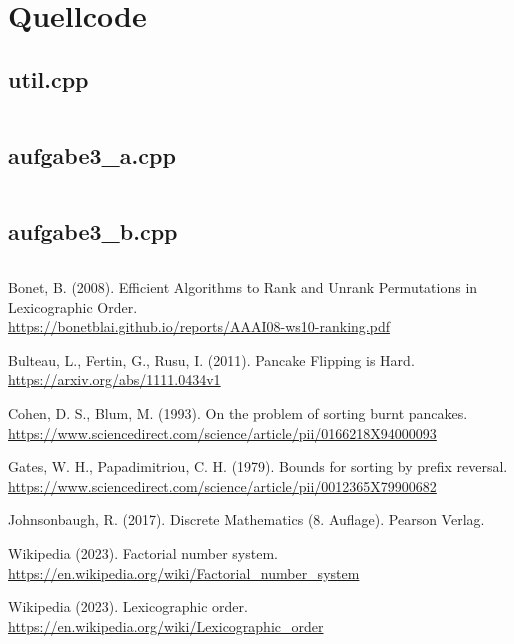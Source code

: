 \documentclass[a4paper, 10pt, ngerman]{article}
\begin{document}
\section{Quellcode}

\subsection{util.cpp}

\inputminted{c++}{aufgabe3/util.cpp}

\subsection{aufgabe3\_a.cpp}

\inputminted{c++}{aufgabe3/aufgabe3_a.cpp}

\subsection{aufgabe3\_b.cpp}

\inputminted{c++}{aufgabe3/aufgabe3_b.cpp}

\begin{thebibliography}{7}
    Bonet, B. (2008).
    Efficient Algorithms to Rank and Unrank Permutations in Lexicographic Order. \\
    \href{https://bonetblai.github.io/reports/AAAI08-ws10-ranking.pdf}{https://bonetblai.github.io/reports/AAAI08-ws10-ranking.pdf}

    Bulteau, L., Fertin, G., Rusu, I. (2011).
    Pancake Flipping is Hard. \\
    \href{https://arxiv.org/abs/1111.0434v1}{https://arxiv.org/abs/1111.0434v1}

    Cohen, D. S., Blum, M. (1993).
    On the problem of sorting burnt pancakes. \\
    \href{https://www.sciencedirect.com/science/article/pii/0166218X94000093}{https://www.sciencedirect.com/science/article/pii/0166218X94000093}

    Gates, W. H., Papadimitriou, C. H. (1979). 
    Bounds for sorting by prefix reversal. \\
    \href{https://www.sciencedirect.com/science/article/pii/0012365X79900682}{https://www.sciencedirect.com/science/article/pii/0012365X79900682}

    Johnsonbaugh, R. (2017).
    Discrete Mathematics (8. Auflage).
    Pearson Verlag.

    Wikipedia (2023).
    Factorial number system. \\
    \href{https://en.wikipedia.org/wiki/Factorial\_number\_system}{https://en.wikipedia.org/wiki/Factorial\_number\_system}

    Wikipedia (2023).
    Lexicographic order. \\
    \href{https://en.wikipedia.org/wiki/Lexicographic\_order}{https://en.wikipedia.org/wiki/Lexicographic\_order}
\end{thebibliography}
\end{document}
